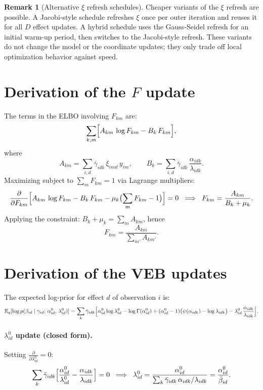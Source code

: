 \documentclass[11pt]{article}
\newcommand{\E}{\mathbb{E}}
\newcommand{\gb}{\bar{\gamma}}
\theoremstyle{definition}
\newtheorem{remark}{Remark}
\begin{document}
\begin{remark}[Alternative $\xi$ refresh schedules]
Cheaper variants of the $\xi$ refresh are possible. A Jacobi-style schedule
refreshes $\xi$ once per outer iteration and reuses it for all $D$ effect
updates. A hybrid schedule uses the Gauss-Seidel refresh for an initial warm-up
period, then switches to the Jacobi-style refresh. These variants do not change
the model or the coordinate updates; they only trade off local optimization
behavior against speed.
\end{remark}

\section{Derivation of the $F$ update}

The terms in the ELBO involving $F_{km}$ are:
\[
  \sum_{k,m} \Bigl[ A_{km}\, \log F_{km} - B_k\, F_{km} \Bigr],
\]
where
\[
  A_{km} = \sum_{i,d} \gb_{idk}\, \xi_{imd}\, y_{im}, \qquad
  B_k = \sum_{i,d} \gb_{idk}\, \frac{\alpha_{idk}}{\lambda_{idk}}.
\]
Maximizing subject to $\sum_m F_{km} = 1$ via Lagrange multipliers:
\[
  \frac{\partial}{\partial F_{km}} \Bigl[ A_{km}\, \log F_{km} - B_k\, F_{km} - \mu_k\bigl(\sum_m F_{km} - 1\bigr) \Bigr] = 0
  \;\;\Longrightarrow\;\;
  F_{km} = \frac{A_{km}}{B_k + \mu_k}.
\]
Applying the constraint: $B_k + \mu_k = \sum_m A_{km}$, hence
\[
  F_{km} = \frac{A_{km}}{\sum_{m'} A_{km'}}.
\]

\section{Derivation of the VEB updates}\label{sec:veb}

The expected log-prior for effect $d$ of observation $i$ is:
\[
  \E_q[\log p(\beta_{id} \mid \gamma_{id};\, \alpha_{id}^0,\, \lambda_{id}^0)]
  = \sum_k \gb_{idk} \Bigl[ \alpha_{id}^0 \log \lambda_{id}^0 - \log \Gamma(\alpha_{id}^0) + (\alpha_{id}^0 - 1)\bigl(\psi(\alpha_{idk}) - \log \lambda_{idk}\bigr) - \lambda_{id}^0\, \frac{\alpha_{idk}}{\lambda_{idk}} \Bigr].
\]

\paragraph{$\lambda_{id}^0$ update (closed form).}
Setting $\frac{\partial}{\partial \lambda_{id}^0} = 0$:
\[
  \sum_k \gb_{idk} \Bigl[ \frac{\alpha_{id}^0}{\lambda_{id}^0} - \frac{\alpha_{idk}}{\lambda_{idk}} \Bigr] = 0
  \;\;\Longrightarrow\;\;
  \lambda_{id}^0 = \frac{\alpha_{id}^0}{\sum_k \gb_{idk}\, \alpha_{idk} / \lambda_{idk}}
  = \frac{\alpha_{id}^0}{\bar{\beta}_{id}}.
\]
\end{document}
